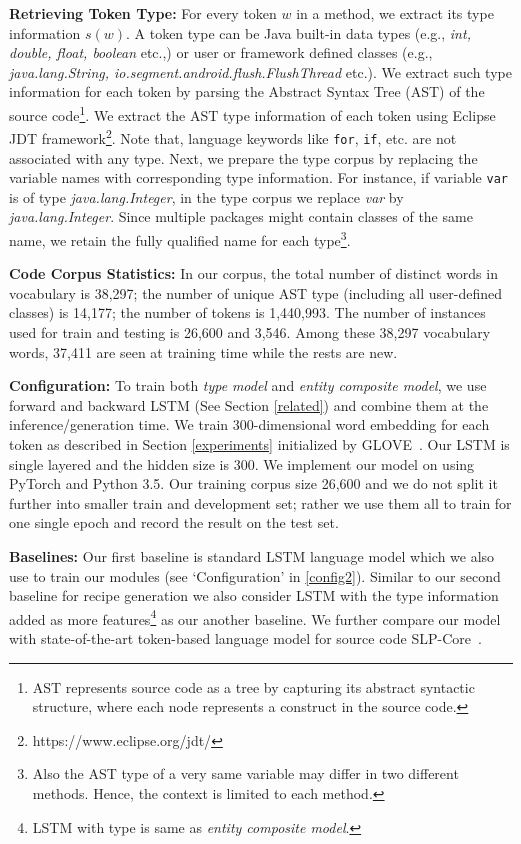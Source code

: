 \documentclass[11pt,a4paper]{article}
\begin{document}
\textbf{Retrieving Token Type:} 
For every token $w$ in a method, we extract its type information $s(w)$. A token type can be Java built-in data types (e.g., \textit{int, double, float, boolean} etc.,) or user or framework defined classes (e.g., {\it java.lang.String, io.segment.android.flush.FlushThread} etc.). We extract such type information for each token by parsing the Abstract Syntax Tree (AST) of the source code\footnote{AST represents source code as a tree by capturing its abstract syntactic structure, where each node represents a construct in the source code.}. We extract the  AST type information of each token using Eclipse JDT framework\footnote{https://www.eclipse.org/jdt/}. Note that, language keywords like {\tt for}, {\tt if}, etc. are not associated with any type. 
Next, we prepare the type corpus by replacing the variable names with corresponding type information. For instance, if variable {\tt var} is of type {\it java.lang.Integer}, in the type corpus we replace {\it var} by {\it java.lang.Integer}. Since multiple packages might contain classes of the same name, we retain the fully qualified name for each type\footnote{Also the AST type of a very same variable may differ in two different methods. Hence, the context is limited to each method.}.



\textbf{Code Corpus Statistics:} \label{stat_code} 
 In our corpus, the total number of distinct words in vocabulary is 38,297; the number of unique AST type (including all user-defined classes) is 14,177; the number of tokens is  1,440,993. The number of instances used for train and testing is 26,600 and 3,546. Among these 38,297 vocabulary words, 37,411 are seen at training time while the rests are new. 


\textbf{Configuration:} \label{config2}
To train both {\it type} {\it model} and {\it entity composite model}, we use forward and backward LSTM (See Section \ref{related}) and combine them at the inference/generation time. We train 300-dimensional word embedding for each token as described in Section \ref{experiments} initialized by GLOVE~\cite{glove}. Our LSTM is single layered and the hidden size is 300. We implement our model on using PyTorch and Python 3.5. 
Our training corpus size 26,600 and we do not split it further into smaller train and development set; rather we use them all to train for one single epoch and record the result on the test set.




\textbf{Baselines:} 
Our  first baseline is standard LSTM language model which we also use to train our modules (see `Configuration' in \ref{config2}).  Similar to our second baseline for recipe generation we also consider LSTM with the type information added as more features\footnote{LSTM with type is same as {\it entity composite  model}.} as our another baseline. We further compare our model with state-of-the-art token-based language model for source code SLP-Core~\cite{deep_net_for_source_code}.
\end{document}
